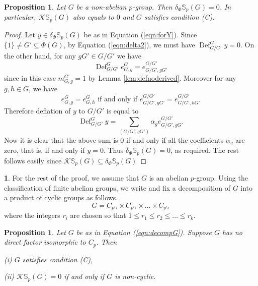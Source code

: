\documentclass[12pt]{article}
\theoremstyle{plain}
\newtheorem{proposition}[theorem]{Proposition}
\theoremstyle{definition}
\newtheorem{nothing}[theorem]{}
\newcommand{\kerlin}{\mathbb S_p}
\newcommand{\defl}{\operatorname{Def}}
\begin{document}
\begin{proposition}\label{pro:nonAb}
    Let $G$ be a non-abelian $p$-group. Then $\delta_\Phi\kerlin(G) = 0$. In particular, $\mathcal K\kerlin(G)$ also equals to $0$ and $G$ satisfies condition (C). 
\end{proposition}
\begin{proof} Let $y\in\delta_\Phi\kerlin(G)$ be as in Equation (\ref{eqn:forY}).
    Since $\{1\} \not =G'\subseteq \Phi(G)$, by Equation (\ref{eqn:delta2}), we must have $\defl^G_{G/G'} y = 0$. On the other hand, for any $gG'\in G/G'$ we have
\[
\defl^G_{G/G'} e_{G, g}^G = e_{G/G', gG'}^{G/G'}
\]
since in this case $m_{G, g}^{G'} = 1$ by Lemma \ref{lem:defnoderived}. 
Moreover for any $g,h\in G$, we have
\[
e_{G, g}^G = e_{G, h}^G \text{ if and only if } e_{G/G', gG'}^{G/G'} = e_{G/G', hG'}^{G/G'}
\]
Therefore deflation of $y$ to $G/G'$ is equal to
\[
\defl^G_{G/G'} y = \sum_{(G/G', gG')} \alpha_{g}e_{G/G', gG'}^{G/G'} 
\]
Now it is clear that the above sum is 0 if and only if all the coefficients $\alpha_g$ are zero, that is, if and only if $y = 0$. Thus $\delta_\Phi\kerlin(G) = 0$, as required. The rest follows easily since $\mathcal{K}\kerlin(G)\subseteq \delta_\Phi\kerlin(G)$ \end{proof} 
\begin{nothing} For the rest of the proof, we assume that $G$ is an abelian $p$-group. Using the classification of finite abelian groups, we write and fix a decomposition of $G$ into a product of cyclic groups as follows. 
\begin{equation}\label{eqn:decompG}
G = C_{p^{r_1}}\times C_{p^{r_2}}\times \ldots\times C_{p^{r_k}}
\end{equation}
where the integers $r_i$ are chosen so that $1\le r_1\le r_2\le \ldots\le r_k$. 
\end{nothing}
\begin{proposition}\label{pro:noCp}
    Let $G$ be as in Equation (\ref{eqn:decompG}). Suppose $G$ has no direct factor isomorphic to $C_p$. Then

    \smallskip

    \noindent \textup{(i)} $G$ satisfies condition (C),

    \smallskip
    
    \noindent \textup{(ii)} $\mathcal K\kerlin(G) = 0$ if and only if $G$ is non-cyclic.
\end{proposition}
\end{document}
